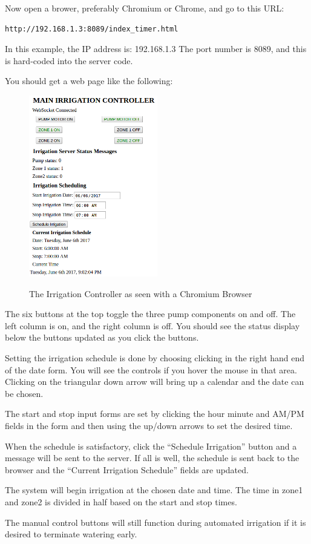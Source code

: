 Now open a brower, preferably Chromium or Chrome, and go to this URL:

\begin{verbatim}
http://192.168.1.3:8089/index_timer.html
\end{verbatim}

In this example, the IP address is: 192.168.1.3
The port number is 8089, and this is hard-coded into the server code.

You should get a web page like the following:

\begin{figure}[h]
	\centering
    \includegraphics[width=0.5\textwidth]{photos/browser_full.png}
	\centering\bfseries
	\caption{The Irrigation Controller as seen with a Chromium Browser}
\end{figure}

The six buttons at the top toggle the three pump components on and off.  The 
left column is on, and the right column is off.  You should see the status 
display below the buttons updated as you click the buttons.

Setting the irrigation schedule is done by choosing clicking in the right hand 
end of the date form.  You will see the controls if you hover the mouse in that 
area.  Clicking on the triangular down arrow will bring up a calendar and the 
date can be chosen.

The start and stop input forms are set by clicking the hour minute and AM/PM 
fields in the form and then using the up/down arrows to set the desired time.

When the schedule is satisfactory, click the ``Schedule Irrigation'' button and 
a message will be sent to the server.  If all is well, the schedule is sent 
back to the browser and the ``Current Irrigation Schedule'' fields are updated.

The system will begin irrigation at the chosen date and time.  The time in 
zone1 and zone2 is divided in half based on the start and stop times.

The manual control buttons will still function during automated irrigation if 
it is desired to terminate watering early.






 
